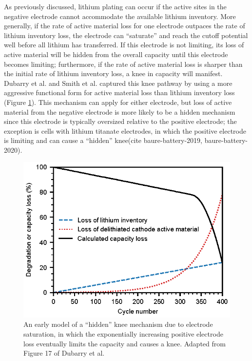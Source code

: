 \documentclass[journal=jpclcd,manuscript=article]{achemso}
\begin{document}
As previously discussed, lithium plating can occur if the active sites in the negative electrode cannot accommodate the available lithium inventory. More generally, if the rate of active material loss for one electrode outpaces the rate of lithium inventory loss, the electrode can ``saturate'' and reach the cutoff potential well before all lithium has transferred. If this electrode is not limiting, its loss of active material will be hidden from the overall capacity until this electrode becomes limiting; furthermore, if the rate of active material loss is sharper than the initial rate of lithium inventory loss, a knee in capacity will manifest. Dubarry et al.\cite{dubarry_synthesize_2012} and Smith et al.\cite{smith_life_2017} captured this knee pathway by using a more aggressive functional form for active material loss than lithium inventory loss (Figure \ref{fig:cathode_sat_simple}). This mechanism can apply for either electrode, but loss of active material from the negative electrode is more likely to be a hidden mechanism since this electrode is typically oversized relative to the positive electrode; the exception is cells with lithium titanate electrodes, in which the positive electrode is limiting and can cause a ``hidden'' knee(cite baure-battery-2019, baure-battery-2020).

\begin{figure}
\centering
\includegraphics[scale = 1]{figures/dubarry_cathode_saturation.eps}
\caption{An early model of a ``hidden'' knee mechanism due to electrode saturation, in which the exponentially increasing positive electrode loss eventually limits the capacity and causes a knee. Adapted from Figure 17 of Dubarry et al.\cite{dubarry_synthesize_2012}
}
\label{fig:cathode_sat_simple}
\end{figure}
\end{document}
